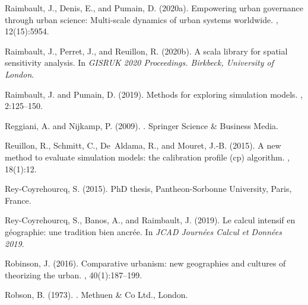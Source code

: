 \documentclass[10pt,letterpaper]{article}
\begin{document}
\begin{thebibliography}{}
Raimbault, J., Denis, E., and Pumain, D. (2020a).
\newblock Empowering urban governance through urban science: Multi-scale
  dynamics of urban systems worldwide.
, 12(15):5954.

Raimbault, J., Perret, J., and Reuillon, R. (2020b).
\newblock A scala library for spatial sensitivity analysis.
\newblock In {\em GISRUK 2020 Proceedings. Birkbeck, University of London}.

Raimbault, J. and Pumain, D. (2019).
\newblock Methods for exploring simulation models.
, 2:125--150.

Reggiani, A. and Nijkamp, P. (2009).
.
\newblock Springer Science \& Business Media.

Reuillon, R., Schmitt, C., De~Aldama, R., and Mouret, J.-B. (2015).
\newblock A new method to evaluate simulation models: the calibration profile
  (cp) algorithm.
,
  18(1):12.

Rey-Coyrehourcq, S. (2015).
\newblock PhD thesis, Pantheon-Sorbonne University, Paris, France.

Rey-Coyrehourcq, S., Banos, A., and Raimbault, J. (2019).
\newblock Le calcul intensif en g{\'e}ographie: une tradition bien ancr{\'e}e.
\newblock In {\em JCAD Journ{\'e}es Calcul et Donn{\'e}es 2019}.

Robinson, J. (2016).
\newblock Comparative urbanism: new geographies and cultures of theorizing the
  urban.
,
  40(1):187--199.

Robson, B. (1973).
.
\newblock Methuen \& Co Ltd., London.


\end{thebibliography}
\end{document}

